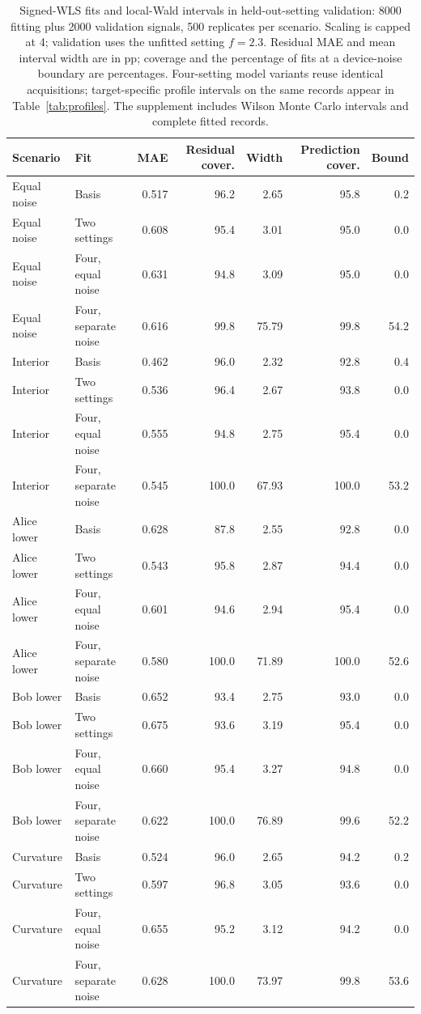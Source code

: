 \begin{table}[!htbp]
\centering
\small\setlength{\tabcolsep}{4pt}
\caption{Signed-WLS fits and local-Wald intervals in held-out-setting validation: 8000 fitting plus 2000 validation signals, 500 replicates per scenario. Scaling is capped at 4; validation uses the unfitted setting $f=2.3$. Residual MAE and mean interval width are in pp; coverage and the percentage of fits at a device-noise boundary are percentages. Four-setting model variants reuse identical acquisitions; target-specific profile intervals on the same records appear in Table~\ref{tab:profiles}. The supplement includes Wilson Monte Carlo intervals and complete fitted records.}
\label{tab:holdout}
\begin{tabular}{@{}llrrrrr@{}}
\toprule
Scenario & Fit & MAE & Residual cover. & Width & Prediction cover. & Bound \\
\midrule
Equal noise & Basis & 0.517 & 96.2 & 2.65 & 95.8 & 0.2 \\
Equal noise & Two settings & 0.608 & 95.4 & 3.01 & 95.0 & 0.0 \\
Equal noise & Four, equal noise & 0.631 & 94.8 & 3.09 & 95.0 & 0.0 \\
Equal noise & Four, separate noise & 0.616 & 99.8 & 75.79 & 99.8 & 54.2 \\
Interior & Basis & 0.462 & 96.0 & 2.32 & 92.8 & 0.4 \\
Interior & Two settings & 0.536 & 96.4 & 2.67 & 93.8 & 0.0 \\
Interior & Four, equal noise & 0.555 & 94.8 & 2.75 & 95.4 & 0.0 \\
Interior & Four, separate noise & 0.545 & 100.0 & 67.93 & 100.0 & 53.2 \\
Alice lower & Basis & 0.628 & 87.8 & 2.55 & 92.8 & 0.0 \\
Alice lower & Two settings & 0.543 & 95.8 & 2.87 & 94.4 & 0.0 \\
Alice lower & Four, equal noise & 0.601 & 94.6 & 2.94 & 95.4 & 0.0 \\
Alice lower & Four, separate noise & 0.580 & 100.0 & 71.89 & 100.0 & 52.6 \\
Bob lower & Basis & 0.652 & 93.4 & 2.75 & 93.0 & 0.0 \\
Bob lower & Two settings & 0.675 & 93.6 & 3.19 & 95.4 & 0.0 \\
Bob lower & Four, equal noise & 0.660 & 95.4 & 3.27 & 94.8 & 0.0 \\
Bob lower & Four, separate noise & 0.622 & 100.0 & 76.89 & 99.6 & 52.2 \\
Curvature & Basis & 0.524 & 96.0 & 2.65 & 94.2 & 0.2 \\
Curvature & Two settings & 0.597 & 96.8 & 3.05 & 93.6 & 0.0 \\
Curvature & Four, equal noise & 0.655 & 95.2 & 3.12 & 94.2 & 0.0 \\
Curvature & Four, separate noise & 0.628 & 100.0 & 73.97 & 99.8 & 53.6 \\
\bottomrule
\end{tabular}
\end{table}

